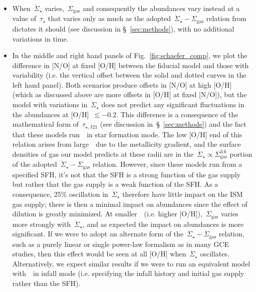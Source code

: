 \documentclass[ms.tex]{subfiles}
\begin{document}
\begin{itemize}
	\item When~$\dot{\Sigma}_\star$ varies,~$\Sigma_\text{gas}$ and 
	consequently the abundances vary instead at a value of~$\tau_\star$ that 
	varies only as much as the adopted~$\dot{\Sigma}_\star - \Sigma_\text{gas}$ 
	relation from~\citet{Johnson2021} dictates it should (see discussion in 
	\S~\ref{sec:methods}), with no additional variations in time. 

	\item In the middle and right hand panels of Fig.~\ref{fig:schaefer_comp}, 
	we plot the difference in [N/O] at fixed [O/H] between the fiducial model 
	and those with variability (i.e. the vertical offset between the solid and 
	dotted curves in the left hand panel). 
	Both scenarios produce offsets in [N/O] at high [O/H] (which as discussed 
	above are more offsets in [O/H] at fixed [N/O]), but the model with 
	variations in~$\dot{\Sigma}_\star$ does not predict any significant 
	fluctuations in the abundances at [O/H]~$\lesssim -0.2$. 
	This difference is a consequence of the mathematical form 
	of~$\tau_{\star,\text{J21}}$ (see discussion in~\S~\ref{sec:methods}) and 
	the fact that these models run~\vice~in star formation mode. 
	The low [O/H] end of this relation arises from large~\rgal~due to the 
	metallicity gradient, and the surface densities of gas our model predicts 
	at these radii are in 
	the~$\dot{\Sigma}_\star \propto \Sigma_\text{gas}^{3.6}$ portion of the 
	adopted~$\dot{\Sigma}_\star - \Sigma_\text{gas}$ relation. 
	However, since these models run from a specified SFH, it's not that the SFH 
	is a strong function of the gas supply but rather that the gas supply is a 
	weak function of the SFH. 
	As a consequence, 25\% oscillation in~$\dot{\Sigma}_\star$ therefore have 
	little impact on the ISM gas supply; there is then a minimal impact on 
	abundances since the effect of dilution is greatly minimized. 
	At smaller~\rgal~(i.e. higher [O/H]),~$\Sigma_\text{gas}$ varies more 
	strongly with~$\dot{\Sigma}_\star$, and as expected the impact on 
	abundances is more significant. 
	If we were to adopt an alternate form of 
	the~$\dot{\Sigma}_\star - \Sigma_\text{gas}$ relation, such as a purely 
	linear or single power-law formalism as in many GCE studies, then this 
	effect would be seen at all [O/H] when~$\dot{\Sigma}_\star$ oscillates. 
	Alternatively, we expect similar results if we were to run an equivalent 
	model with~\vice~in infall mode (i.e. specifying the infall history and 
	initial gas supply rather than the SFH). 


\end{itemize}
\end{document}

